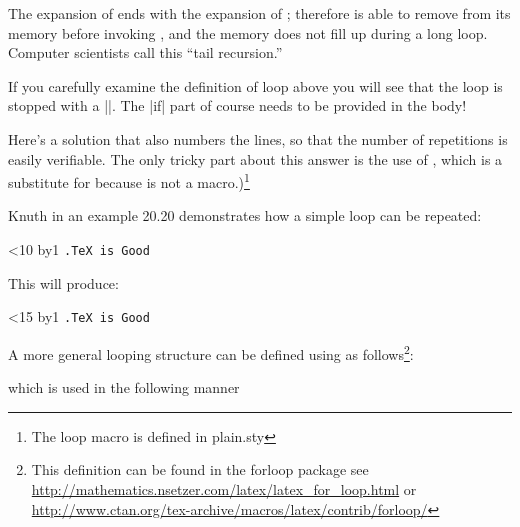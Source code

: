 \begin{teX}
\begin{teX}
\begin{teX}
\begin{teX}
\def\loop#1\repeat{\def\body{#1}\iterate}
\def\iterate{\body\let\next=\iterate\else\let\next=\relax\fi\next}
\end{teX}



The expansion of  ends with the expansion of ; therefore \tex is able
to remove  from its memory before invoking , and the memory does not
fill up during a long loop. Computer scientists call this ``tail recursion.''

If you carefully examine the definition of loop above you will see that the loop is stopped with a |\relax\fi|. The |if| part of course needs to be provided in the body!


Here's a solution that also numbers the lines, so that the number of repetitions
is easily verifiable. The only tricky part about this answer is the use of , which
is a substitute for  because  is not a  macro.)\footnote{The loop macro is defined in plain.sty}

Knuth in an example 20.20 demonstrates how a simple loop can be repeated:

\begin{teX}
\newcount\n
\def\punishment#1#2{\n=0
    \loop\ifnum\n<#2 \advance\n by1
         {\tt {\number\n.}#1\endgraf}\repeat}
    \punishment{TeX is Good}{10}
\end{teX}

This will produce:

\newcount\n
\def\punishment#1#2{\n=0
\loop\ifnum\n<#2 \advance\n by1
{\tt {\number\n.}#1\endgraf}\repeat}

\punishment{TeX is Good}{15}



A more general looping structure can be defined using \latex as follows\footnote{This definition can be found in the forloop package see \url{http://mathematics.nsetzer.com/latex/latex_for_loop.html} or \url{http://www.ctan.org/tex-archive/macros/latex/contrib/forloop/}}:

\begin{teX}
\newcommand{\forloop}[5][1]%
{%
\setcounter{#2}{#3}%
\ifthenelse{#4}%
	{%
	#5%
	\addtocounter{#2}{#1}%
	\forloop[#1]{#2}{\value{#2}}{#4}{#5}%
	}%
	{%
	}%
}%
\end{teX}

which is used in the following manner


\begin{teX}
\end{teX}




\end{teX}
\end{teX}
\end{teX}
